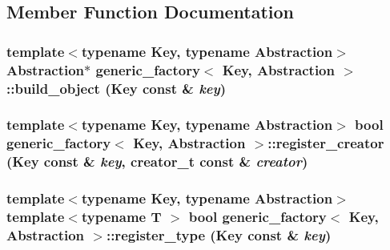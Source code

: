 \subsection{Member Function Documentation}
\hypertarget{structgeneric__factory_ac58528ffbeed39f52ed7e97f2f4d946c}{
\subsubsection[{build\_\-object}]{\setlength{\rightskip}{0pt plus 5cm}template$<$typename Key, typename Abstraction$>$ Abstraction$\ast$ {\bf generic\_\-factory}$<$ Key, Abstraction $>$::build\_\-object (Key const \& {\em key})}}
\label{structgeneric__factory_ac58528ffbeed39f52ed7e97f2f4d946c}
\hypertarget{structgeneric__factory_af6200cfbbc83b6ad06b97f026e66ede6}{
\subsubsection[{register\_\-creator}]{\setlength{\rightskip}{0pt plus 5cm}template$<$typename Key, typename Abstraction$>$ bool {\bf generic\_\-factory}$<$ Key, Abstraction $>$::register\_\-creator (Key const \& {\em key}, \/  {\bf creator\_\-t} const \& {\em creator})}}
\label{structgeneric__factory_af6200cfbbc83b6ad06b97f026e66ede6}
\hypertarget{structgeneric__factory_a8b200556fb68870167f60b82221c3be2}{
\subsubsection[{register\_\-type}]{\setlength{\rightskip}{0pt plus 5cm}template$<$typename Key, typename Abstraction$>$ template$<$typename T $>$ bool {\bf generic\_\-factory}$<$ Key, Abstraction $>$::register\_\-type (Key const \& {\em key})}}
\label{structgeneric__factory_a8b200556fb68870167f60b82221c3be2}


